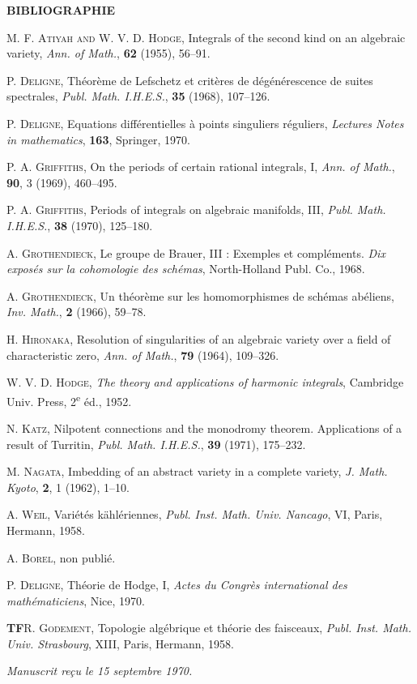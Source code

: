 \documentclass[10pt]{article}
\begin{document}
\begin{center}
\bfseries BIBLIOGRAPHIE
\end{center}

\begin{enumerate}[label={[\arabic*]},leftmargin=2.8em]
\item \textsc{M. F. Atiyah and W. V. D. Hodge}, Integrals of the second kind on an algebraic variety, \emph{Ann. of Math.}, \textbf{62} (1955), 56--91.
\item \textsc{P. Deligne}, Théorème de Lefschetz et critères de dégénérescence de suites spectrales, \emph{Publ. Math. I.H.E.S.}, \textbf{35} (1968), 107--126.
\item \textsc{P. Deligne}, Equations différentielles à points singuliers réguliers, \emph{Lectures Notes in mathematics}, \textbf{163}, Springer, 1970.
\item \textsc{P. A. Griffiths}, On the periods of certain rational integrals, I, \emph{Ann. of Math.}, \textbf{90}, 3 (1969), 460--495.
\item \textsc{P. A. Griffiths}, Periods of integrals on algebraic manifolds, III, \emph{Publ. Math. I.H.E.S.}, \textbf{38} (1970), 125--180.
\item \textsc{A. Grothendieck}, Le groupe de Brauer, III : Exemples et compléments. \emph{Dix exposés sur la cohomologie des schémas}, North-Holland Publ. Co., 1968.
\item \textsc{A. Grothendieck}, Un théorème sur les homomorphismes de schémas abéliens, \emph{Inv. Math.}, \textbf{2} (1966), 59--78.
\item \textsc{H. Hironaka}, Resolution of singularities of an algebraic variety over a field of characteristic zero, \emph{Ann. of Math.}, \textbf{79} (1964), 109--326.
\item \textsc{W. V. D. Hodge}, \emph{The theory and applications of harmonic integrals}, Cambridge Univ. Press, 2\textsuperscript{e} éd., 1952.
\item \textsc{N. Katz}, Nilpotent connections and the monodromy theorem. Applications of a result of Turritin, \emph{Publ. Math. I.H.E.S.}, \textbf{39} (1971), 175--232.
\item \textsc{M. Nagata}, Imbedding of an abstract variety in a complete variety, \emph{J. Math. Kyoto}, \textbf{2}, 1 (1962), 1--10.
\item \textsc{A. Weil}, Variétés kählériennes, \emph{Publ. Inst. Math. Univ. Nancago}, VI, Paris, Hermann, 1958.
\item \textsc{A. Borel}, non publié.
\item \textsc{P. Deligne}, Théorie de Hodge, I, \emph{Actes du Congrès international des mathématiciens}, Nice, 1970.
\end{enumerate}

\noindent\textbf{TF}\quad \textsc{R. Godement}, Topologie algébrique et théorie des faisceaux, \emph{Publ. Inst. Math. Univ. Strasbourg}, XIII, Paris, Hermann, 1958.

\begin{center}
\emph{Manuscrit reçu le 15 septembre 1970.}
\end{center}

\end{document}

